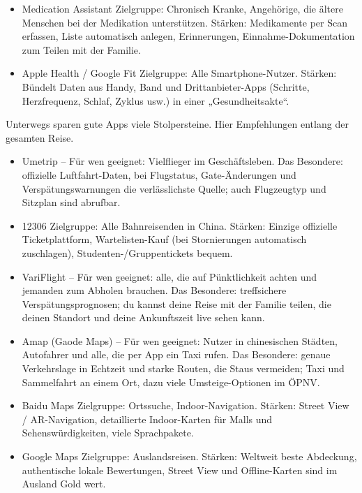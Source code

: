 
\begin{itemize}
  \item Medication Assistant Zielgruppe: Chronisch Kranke, Angehörige, die ältere Menschen bei der Medikation unterstützen. Stärken: Medikamente per Scan erfassen, Liste automatisch anlegen, Erinnerungen, Einnahme-Dokumentation zum Teilen mit der Familie.
\end{itemize}


\begin{itemize}
  \item Apple Health / Google Fit Zielgruppe: Alle Smartphone-Nutzer. Stärken: Bündelt Daten aus Handy, Band und Drittanbieter-Apps (Schritte, Herzfrequenz, Schlaf, Zyklus usw.) in einer „Gesundheitsakte“.
\end{itemize}


Unterwegs sparen gute Apps viele Stolpersteine. Hier Empfehlungen entlang der gesamten Reise.


\begin{itemize}
  \item Umetrip – Für wen geeignet: Vielflieger im Geschäftsleben. Das Besondere: offizielle Luftfahrt-Daten, bei Flugstatus, Gate-Änderungen und Verspätungswarnungen die verlässlichste Quelle; auch Flugzeugtyp und Sitzplan sind abrufbar.
  \item 12306 Zielgruppe: Alle Bahnreisenden in China. Stärken: Einzige offizielle Ticketplattform, Wartelisten-Kauf (bei Stornierungen automatisch zuschlagen), Studenten-/Gruppentickets bequem.
  \item VariFlight – Für wen geeignet: alle, die auf Pünktlichkeit achten und jemanden zum Abholen brauchen. Das Besondere: treffsichere Verspätungsprognosen; du kannst deine Reise mit der Familie teilen, die deinen Standort und deine Ankunftszeit live sehen kann.
\end{itemize}


\begin{itemize}
  \item Amap (Gaode Maps) – Für wen geeignet: Nutzer in chinesischen Städten, Autofahrer und alle, die per App ein Taxi rufen. Das Besondere: genaue Verkehrslage in Echtzeit und starke Routen, die Staus vermeiden; Taxi und Sammelfahrt an einem Ort, dazu viele Umsteige-Optionen im ÖPNV.
  \item Baidu Maps Zielgruppe: Ortssuche, Indoor-Navigation. Stärken: Street View / AR-Navigation, detaillierte Indoor-Karten für Malls und Sehenswürdigkeiten, viele Sprachpakete.
  \item Google Maps Zielgruppe: Auslandsreisen. Stärken: Weltweit beste Abdeckung, authentische lokale Bewertungen, Street View und Offline-Karten sind im Ausland Gold wert.
\end{itemize}

